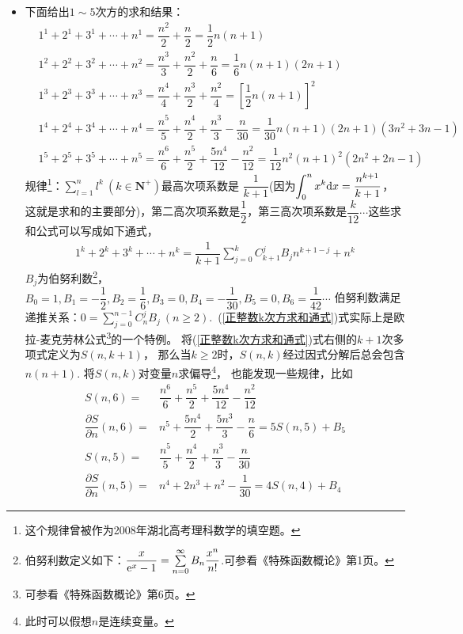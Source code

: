 \begin{itemize}[leftmargin=\inteval{\myitemleftmargin}pt,itemsep=
   \inteval{\myitemitempsep}pt,topsep=\inteval{\myitemtopsep}pt]
\item 下面给出$ 1\sim 5 $次方的求和结果：
\begin{align*}
    & 1^1+2^1+3^1+\cdots +n^1=\dfrac{n^2}{2}+\dfrac{n}{2} =\dfrac{1}{2}n(n+1)\\
    & 1^2+2^2+3^2+\cdots +n^2=\dfrac{n^3}{3}+\dfrac{n^2}{2}+\dfrac{n}{6}=\dfrac{1}{6}n(n+1)(2n+1)\\
    & 1^3+2^3+3^3+\cdots +n^3=\dfrac{n^4}{4}+\dfrac{n^3}{2}+\dfrac{n^2}{4}=
    \left[\dfrac{1}{2}n(n+1) \right]^2 \\
    & 1^4+2^4+3^4+\cdots +n^4=\dfrac{n^5}{5}+\dfrac{n^4}{2}+\dfrac{n^3}{3}-\dfrac{n}{30}
    =\dfrac{1}{30}n(n+1)(2n+1)(3n^2+3n-1) \\
    & 1^5+2^5+3^5+\cdots +n^5=\dfrac{n^6}{6}+\dfrac{n^5}{2}+\dfrac{5n^4}{12}-\dfrac{n^2}{12} 
    =\dfrac{1}{12}n^2(n+1)^2(2n^2+2n-1)
\end{align*}
规律\footnote{这个规律曾被作为2008年湖北高考理科数学的填空题。}：$ \sum\limits_{l=1}^{n} l^k \ (k\in \textbf{N}^+) $最高次项系数是
$ \dfrac{1}{k+1} $(因为$ \displaystyle \int_0^n x^k\mathrm{d} x=\dfrac{n^{k+1}}{k+1} $，
这就是求和的主要部分)，第二高次项系数是$ \dfrac{1}{2} $，第三高次项系数是$ \dfrac{k}{12} \cdots$这些求和公式可以写成如下通式，
\begin{align}\label{正整数k次方求和通式}
    1^k+2^k+3^k+\cdots +n^k=\dfrac{1}{k+1}
    \sum_{j=0}^{k}C_{k+1}^{j}B_{j}n^{k+1-j}+n^{k}
\end{align}
$ B_j $为伯努利数\footnote{伯努利数定义如下：$ \dfrac{x}{\mathrm{e}^x-1}=
    \sum\limits_{n=0}^{\infty}B_n\dfrac{x^n}{n!} $.可参看《特殊函数概论》第1页。}，
$ B_0=1,B_1=-\dfrac{1}{2},B_2=\dfrac{1}{6},B_3=0,B_4=-\dfrac{1}{30},
B_5=0,B_6=\dfrac{1}{42}\cdots$
伯努利数满足递推关系：$ 0=\sum\limits_{j=0}^{n-1}C_n^jB_j\ (n\geq 2) $.\ 
(\ref{正整数k次方求和通式})式实际上是欧拉-麦克劳林公式\footnote{可参看《特殊函数概论》第6页。}的一个特例。
将(\ref{正整数k次方求和通式})式右侧的$ k+1 $次多项式定义为$ S(n,k+1) $，
那么当$ k\geq 2 $时，$ S(n,k) $经过因式分解后总会包含$ n(n+1) $.
将$ S(n,k) $对变量$ n $求偏导\footnote{此时可以假想$ n $是连续变量。}，
也能发现一些规律，比如
\begin{align*}
    S(n,6) =&\dfrac{n^6}{6} +\dfrac{n^5}{2}+\dfrac{5n^4}{12}-\dfrac{n^2}{12}\\
    \dfrac{\partial S}{\partial n}(n,6)=&n^5+\dfrac{5n^4}{2}+
    \dfrac{5n^3}{3}-\dfrac{n}{6}=5S(n,5)+B_5 \\
    S(n,5) =&\dfrac{n^5}{5}+\dfrac{n^4}{2}+\dfrac{n^3}{3}-\dfrac{n}{30} \\
    \dfrac{\partial S}{\partial n}(n,5)=&n^4+2n^3+n^2-\dfrac{1}{30}=4S(n,4)+B_4

\end{align*}
\end{itemize}
